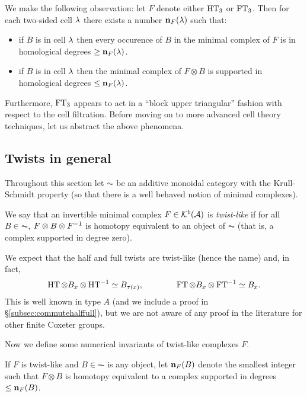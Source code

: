 We make the following observation: let $F$ denote either $\operatorname{HT}_3$ or $\operatorname{FT}_3$.  Then for each two-sided cell $\lambda$ there exists a number ${\mathbf n}_F(\lambda)$ such that:
\begin{itemize}
\item if $B$ is in cell $\lambda$ then every occurence of $B$ in the minimal complex of $F$ is in homological degrees $\geq {\mathbf n}_F(\lambda)$.
\item if $B$ is in cell $\lambda$ then the minimal complex of $F\otimes B$ is supported in homological degrees $\leq {\mathbf n}_F(\lambda)$.
\end{itemize}
Furthermore, $\operatorname{FT}_3$ appears to act in a ``block upper triangular'' fashion with respect to the cell filtration.  Before moving on to more advanced cell theory techniques, let us abstract the above phenomena.


\subsection{Twists in general}
\label{subsec:twists}

Throughout this section let $\AC$ be an additive monoidal category with the Krull-Schmidt property (so that there is a well behaved notion of minimal complexes).  


\begin{definition}\label{def:twistlike}  We say that an invertible minimal complex $F\in {\mathcal{K}}^b({\mathcal{A}})$ is \emph{twist-like} if for all $B \in \AC$, $F\otimes B\otimes F^{-1}$ is homotopy equivalent to an object of $\AC$ (that is, a complex supported in degree zero).  
\end{definition}


\begin{remark}\label{rmk:twistsAreTwists}
We expect that the half and full twists are twist-like (hence the name) and, in fact, 
\[
\operatorname{HT}\otimes B_x\otimes \operatorname{HT}^{-1} \simeq B_{\tau(x)}, \qquad\qquad \operatorname{FT}\otimes B_x\otimes \operatorname{FT}^{-1} \simeq B_x.
\]
This is well known in type $A$ (and we include a proof in  \S \ref{subsec:commutehalffull}), but we are not aware of any proof in the literature for other finite Coxeter groups.
\end{remark}

Now we define some numerical invariants of twist-like complexes $F$.

\begin{defn}\label{def:nb}
If $F$ is twist-like and $B\in \AC$ is any object, let ${\mathbf n}_F(B)$ denote the smallest integer such that $F\otimes B$ is homotopy equivalent to a complex supported in degrees $\leq {\mathbf n}_F(B)$.
\end{defn}


